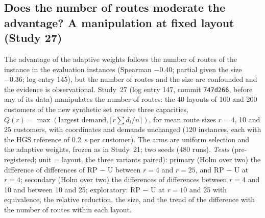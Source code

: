 \subsection{Does the number of routes moderate the advantage? A manipulation at fixed layout (Study 27)}\label{sec:s27design}
The advantage of the adaptive weights follows the number of routes of the instance in the evaluation instances (Spearman $-0.40$; partial given the size $-0.36$; log entry 145), but the number of routes and the size are confounded and the evidence is observational. Study~27 (log entry 147, commit \texttt{747d266}, before any of its data) manipulates the number of routes: the 40 layouts of 100 and 200 customers of the new synthetic set receive three capacities, $Q(r)=\max(\text{largest demand},\lceil r\sum d_i/n\rceil)$, for mean route sizes $r=4$, 10 and 25 customers, with coordinates and demands unchanged (120 instances, each with the HGS reference of 0.2~s per customer). The arms are uniform selection and the adaptive weights, frozen as in Study~21; two seeds (480 runs). \emph{Tests} (pre-registered; unit = layout, the three variants paired): primary (Holm over two) the difference of differences of RP $-$ U between $r=4$ and $r=25$, and RP $-$ U at $r=4$; secondary (Holm over two) the differences of differences between $r=4$ and 10 and between 10 and 25; exploratory: RP $-$ U at $r=10$ and 25 with equivalence, the relative reduction, the size, and the trend of the difference with the number of routes within each layout.


